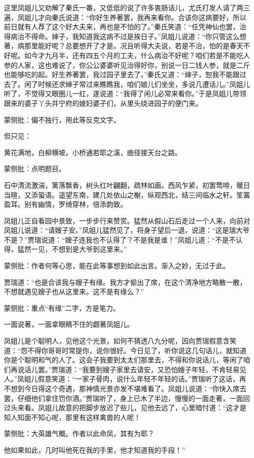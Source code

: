 \begin{parag}
    这里凤姐儿又劝解了秦氏一番，又低低的说了许多衷肠话儿，尤氏打发人请了两三遍，凤姐儿才向秦氏说道：“你好生养著罢，我再来看你。合该你这病要好，所以前日就有人荐了这个好大夫来，再也是不怕的了。”秦氏笑道：“任凭神仙也罢，治得病治不得命。婶子，我知道我这病不过是挨日子。”凤姐儿说道：“你只管这么想著，病那里能好呢？总要想开了才是。况且听得大夫说，若是不治，怕的是春天不好呢。如今才九月半，还有四五个月的工夫，什么病治不好呢？咱们若是不能吃人参的人家，这也难说了，你公公婆婆听见治得好你，别说一日二钱人参，就是二斤也能够吃的起。好生养著罢，我过园子里去了。”秦氏又道：“婶子，恕我不能跟过去了。闲了时候还求婶子常过来瞧瞧我，咱们娘儿们坐坐，多说几遭话儿。”凤姐儿听了，不觉得又眼圈儿一红，遂说道：“我得了闲儿必常来看你。”于是凤姐儿带领跟来的婆子丫头并宁府的媳妇婆子们，从里头绕进园子的便门来。\begin{note}蒙侧批：偏不独行，用此等反克文字。\end{note}但只见：
\end{parag}
\begin{qute2sp}
    黄花满地，白柳横坡。小桥通若耶之溪，曲径接天台之路。\begin{note}蒙侧批：点明题目。\end{note}石中清流激湍，篱落飘香，树头红叶翩翻，疏林如画。西风乍紧，初罢莺啼，暖日当暄，又添蛩语。遥望东南，建几处依山之榭，纵观西北，结三间临水之轩。笙簧盈耳。别有幽情，罗绮穿林，倍添韵致。
\end{qute2sp}
\begin{parag}
    凤姐儿正自看园中景致，一步步行来赞赏。猛然从假山石后走过一个人来，向前对凤姐儿说道：“请嫂子安。”凤姐儿猛然见了，将身子望后一退，说道：“这是瑞大爷不是？”贾瑞说道：“嫂子连我也不认得了？不是我是谁！”凤姐儿道：“不是不认得，猛然一见，不想到是大爷到这里来。”\begin{note}蒙侧批：作者何等心思，能在此等事想到如此出言。渐入之妙，无过于此。\end{note}贾瑞道：“也是合该我与嫂子有缘。我方才偷出了席，在这个清净地方略散一散，不想就遇见嫂子也从这里来。这不是有缘么？”\begin{note}蒙侧批：重点“有缘”二字，方是笔力。\end{note}一面说著，一面拿眼睛不住的觑著凤姐儿。
\end{parag}


\begin{parag}
    凤姐儿是个聪明人，见他这个光景，如何不猜透八九分呢，因向贾瑞假意含笑道：“怨不得你哥哥时常提你，说你很好。今日见了，听你说这几句话儿，就知道你是个聪明和气的人了。这会子我要到太太们那里去，不得和你说话儿，等闲了咱们再说话儿罢。”贾瑞道：“我要到嫂子家里去请安，又恐怕嫂子年轻，不肯轻易见人。”凤姐儿假意笑道：“一家子骨肉，说什么年轻不年轻的话。”贾瑞听了这话，再不想到今日得这个奇遇，那神情光景亦发不堪难看了。凤姐儿说道：“你快入席去罢，仔细他们拿住罚你酒。”贾瑞听了，身上已木了半边，慢慢的一面走著，一面回过头来看。凤姐儿故意的把脚步放迟了些儿，见他去远了，心里暗忖道：“这才是知人知面不知心呢，那里有这样禽兽的人呢！\begin{note}蒙侧批：大英雄气概。作者以此命凤，其有为耶？\end{note}他如果如此，几时叫他死在我的手里，他才知道我的手段！”
\end{parag}


